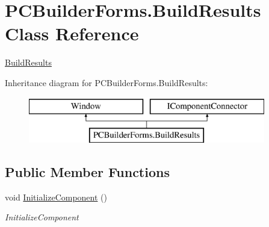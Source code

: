\hypertarget{class_p_c_builder_forms_1_1_build_results}{}\section{P\+C\+Builder\+Forms.\+Build\+Results Class Reference}
\label{class_p_c_builder_forms_1_1_build_results}


\hyperlink{class_p_c_builder_forms_1_1_build_results}{Build\+Results}  


Inheritance diagram for P\+C\+Builder\+Forms.\+Build\+Results\+:\begin{figure}[H]
\begin{center}
\leavevmode
\includegraphics[height=2.000000cm]{class_p_c_builder_forms_1_1_build_results}
\end{center}
\end{figure}
\subsection*{Public Member Functions}
\begin{DoxyCompactItemize}
\item 
void \hyperlink{class_p_c_builder_forms_1_1_build_results_a9c575c605cc69bafccc43687729b9f4c}{Initialize\+Component} ()
\begin{DoxyCompactList}\small\item\em Initialize\+Component \end{DoxyCompactList}\end{DoxyCompactItemize}
